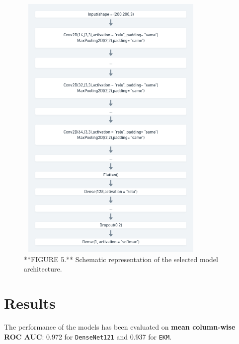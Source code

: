 \documentclass{acm_proc_article-sp}
\begin{document}
\begin{figure}

{\centering \includegraphics[width=350px,height=500]{Images/BaseNetShort} 

}

\caption{**FIGURE 5.** Schematic representation of the selected model architecture.}\label{fig:basenet}
\end{figure}

\hypertarget{results}{%
\section{Results}\label{results}}

The performance of the models has been evaluated on \textbf{mean
column-wise ROC AUC}: 0.972 for \texttt{DenseNet121} and 0.937 for
\texttt{EKM}.
\end{document}
